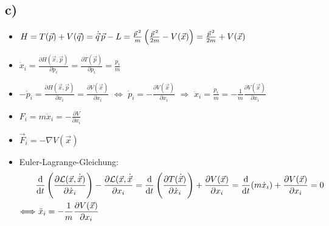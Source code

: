 \subsection*{c)}
\begin{itemize}
	\item $H = T(\vec{p}) + V(\vec{q}) 
		= \dot{\vec{q}} \, \vec{p} - L
		= \frac{\vec{p}^{\,2}}{m} \left( \frac{\vec{p}^{\,2}}{2 m} - V(\vec{x}) \right)
		= \frac{\vec{p}^{\,2}}{2 m} + V(\vec{x})$
	\item $\dot{x}_i = \frac{\partial H(\vec{x}, \vec{p})}{\partial p_i} = \frac{\partial T(\vec{p})}{\partial p_i} = \frac{p_i}{m}$
	\item $- \dot{p}_i = \frac{\partial H(\vec{x}, \vec{p})}{\partial x_i} = \frac{\partial V(\vec{x})}{\partial x_i}$ $\Longleftrightarrow$ $\dot{p}_i = - \frac{\partial V(\vec{x})}{\partial x_i}$ $\Longrightarrow$ $\ddot{x}_i = \frac{\dot{p}_i}{m} = - \frac{1}{m} \frac{\partial V(\vec{x})}{\partial x_i}$
	\item $F_i = m \ddot{x}_i = - \frac{\partial V}{\partial x_i}$
	\item $\vec{F}_i = - \nabla V(\vec{x})$
	\item Euler-Lagrange-Gleichung:
	\begin{align*}
		& \frac{\mathrm{d}}{\mathrm{d}t} \left( \frac{\partial \mathcal{L}(\vec{x}, \dot{\vec{x}})}{\partial \dot{x}_i} \right) - \frac{\partial \mathcal{L}(\vec{x}, \dot{\vec{x}}}{\partial x_i} 
		= \frac{\mathrm{d}}{\mathrm{d}t} \left( \frac{\partial T(\dot{\vec{x}})}{\partial \dot{x}_i} \right) + \frac{\partial V(\vec{x})}{\partial x_i} 
		= \frac{\mathrm{d}}{\mathrm{d}t}	(m \dot{x}_i) + \frac{\partial V(\vec{x})}{\partial x_i} = 0 \\
		\Longleftrightarrow &~ \ddot{x}_i = - \frac{1}{m} \frac{\partial V(\vec{x})}{\partial x_i}
	\end{align*}

\end{itemize}